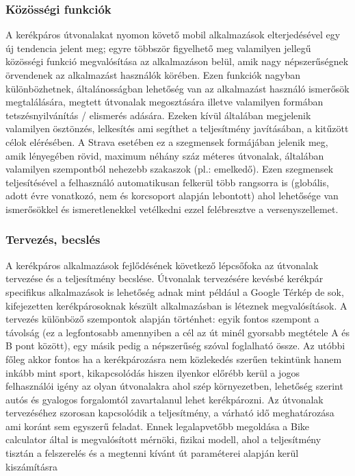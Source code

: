 \subsubsection{Közösségi funkciók} 
A kerékpáros útvonalakat nyomon követő mobil alkalmazások elterjedésével egy új tendencia jelent meg; egyre többször figyelhető meg valamilyen jellegű közösségi funkció megvalósítása az alkalmazáson belül, amik nagy népszerűségnek örvendenek az alkalmazást használók körében. Ezen funkciók nagyban különbözhetnek, általánosságban lehetőség van az alkalmazást használó ismerősök megtalálására, megtett útvonalak megosztására illetve valamilyen formában tetszésnyilvánítás / elismerés adására. Ezeken kívül általában megjelenik valamilyen ösztönzés, lelkesítés ami segíthet a teljesítmény javításában, a kitűzött célok elérésében. A Strava esetében ez a szegmensek formájában jelenik meg, amik lényegében rövid, maximum néhány száz méteres útvonalak, általában valamilyen szempontból nehezebb szakaszok (pl.: emelkedő). Ezen szegmensek teljesítésével a felhasználó automatikusan felkerül több rangsorra is (globális, adott évre vonatkozó, nem és korcsoport alapján lebontott) ahol lehetősége van ismerősökkel és ismeretlenekkel vetélkedni ezzel felébresztve a versenyszellemet. 

\subsubsection{Tervezés, becslés} 
A kerékpáros alkalmazások fejlődésének következő lépcsőfoka az útvonalak tervezése és a teljesítmény becslése. Útvonalak tervezésére kevésbé kerékpár specifikus alkalmazások is lehetőség adnak mint például a Google Térkép de sok, kifejezetten kerékpárosoknak készült alkalmazásban is léteznek megvalósítások. A tervezés különböző szempontok alapján történhet: egyik fontos szempont a távolság (ez a legfontosabb amennyiben a cél az út minél gyorsabb megtétele A és B pont között), egy másik pedig a népszerűség szóval foglalható össze. Az utóbbi főleg akkor fontos ha a kerékpározásra nem közlekedés szerűen tekintünk hanem inkább mint sport, kikapcsolódás hiszen ilyenkor előrébb kerül a jogos felhasználói igény az olyan útvonalakra ahol szép környezetben, lehetőség szerint autós és gyalogos forgalomtól zavartalanul lehet kerékpározni. Az útvonalak tervezéséhez szorosan kapcsolódik a teljesítmény, a várható idő meghatározása ami koránt sem egyszerű feladat. Ennek legalapvetőbb megoldása a Bike calculator által is megvalósított mérnöki, fizikai modell, ahol a teljesítmény tisztán a felszerelés és a megtenni kívánt út paraméterei alapján kerül kiszámításra



